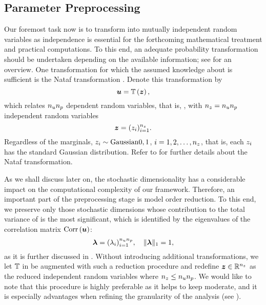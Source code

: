 \subsection{Parameter Preprocessing}

Our foremost task now is to transform \vu into mutually independent random
variables as independence is essential for the forthcoming mathematical
treatment and practical computations. To this end, an adequate probability
transformation should be undertaken depending on the available information; see
\cite{eldred2008} for an overview. One transformation for which the assumed
knowledge about \vu is sufficient is the Nataf transformation \cite{li2008}.
Denote this transformation by
\[
  \vu = \transform{\vz},
\]
which relates $\nu \np$ dependent random variables, that is, \vu, with $\nz =
\nu \np$ independent random variables
\[
  \vz = (\z_i)_{i = 1}^\nz.
\]
Regardless of the marginals, $\z_i \sim \mathrm{Gaussian}{0, 1}$, $i = 1, 2,
\dots, \nz$, that is, each $\z_i$ has the standard Gaussian distribution. Refer
to  for further details about the Nataf
transformation.

As we shall discuss later on, the stochastic dimensionality \nz has a
considerable impact on the computational complexity of our framework. Therefore,
an important part of the preprocessing stage is model order reduction. To this
end, we preserve only those stochastic dimensions whose contribution to the
total variance of \vu is the most significant, which is identified by the
eigenvalues of the correlation matrix $\correlation{\vu}$:
\[
  \v{\lambda} = (\lambda_i)_{i = 1}^{\nu \np}, \hspace{1em}
  \norm[1]{\v{\lambda}} = 1,
\]
as it is further discussed in . Without introducing
additional transformations, we let $\transform$ in
 be augmented with such a reduction procedure
and redefine $\vz \in \real^\nz$ as the reduced independent random variables
where $\nz \leq \nu \np$. We would like to note that this procedure is highly
preferable as it helps to keep \nz moderate, and it is especially advantages
when refining the granularity of the analysis (see ).

